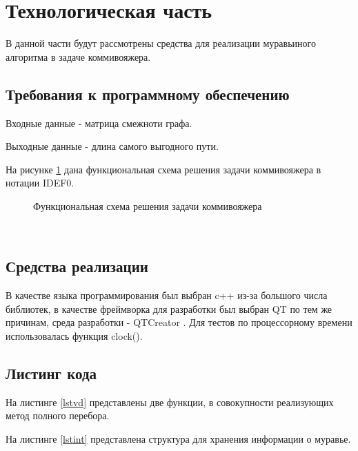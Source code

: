 \documentclass[a4paper, 14pt]{article}
\begin{document}
        \section{Технологическая часть}
        В данной части будут рассмотрены средства для реализации муравьиного алгоритма в задаче коммивояжера.
        \subsection{Требования к программному обеспечению}
        Входные данные - матрица смежноти графа.
        
        Выходные данные - длина самого выгодного пути.
        
        На рисунке \ref{fig:schema_vinograd_optimized} дана функциональная схема решения задачи коммивояжера в нотации IDEF0.
          \begin{figure}[h]
        	\caption{Функциональная схема решения задачи коммивояжера}
        	\label{fig:schema_vinograd_optimized}
        \end{figure} \\
		\subsection{Средства реализации}
		В качестве языка программирования был выбран c++ \cite{c++} из-за большого числа библиотек, в качестве фреймворка для разработки был выбран QT \cite{qt} по тем же причинам, среда разработки - QTCreator \cite{qtc}. Для тестов по процессорному времени использовалась функция clock().
        \subsection{Листинг кода}
        
		На листинге \ref{lstvd} представлены две функции, в совокупности реализующих метод полного перебора.
  
        

		На листинге \ref{lstint} представлена структура для хранения информации о муравье.
		
\end{document}
